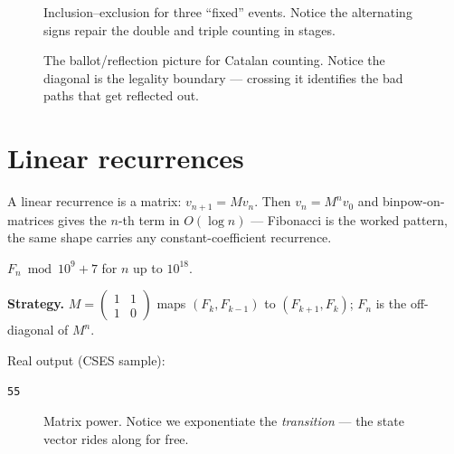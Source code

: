 \begin{figure}[ht]\centering

\caption{Inclusion--exclusion for three ``fixed'' events. Notice
the alternating signs repair the double and triple counting in
stages.}
\label{fig:venn}
\end{figure}
\begin{figure}[ht]\centering

\caption{The ballot/reflection picture for Catalan counting.
Notice the diagonal is the legality boundary --- crossing it
identifies the bad paths that get reflected out.}
\label{fig:ballot}
\end{figure}

\section{Linear recurrences}\label{sec:matpow}
A linear recurrence is a matrix: $v_{n+1}=Mv_n$. Then $v_n=M^n v_0$
and binpow-on-matrices gives the $n$-th term in $O(\log n)$ ---
Fibonacci is the worked pattern, the same shape carries any
constant-coefficient recurrence.
\begin{example}\label{ex:fib}
$F_n \bmod 10^9{+}7$ for $n$ up to $10^{18}$.
\par\smallskip
\textbf{Strategy.} $M=\begin{pmatrix}1&1\\1&0\end{pmatrix}$ maps
$(F_k,F_{k-1})$ to $(F_{k+1},F_k)$; $F_n$ is the off-diagonal of
$M^n$.
\par\smallskip
\begin{solution}

Real output (CSES sample):
\begin{lstlisting}[numbers=none]
55
\end{lstlisting}
\end{solution}
\end{example}
\begin{figure}[ht]\centering

\caption{Matrix power. Notice we exponentiate the \emph{transition}
--- the state vector rides along for free.}
\label{fig:matpow}
\end{figure}

